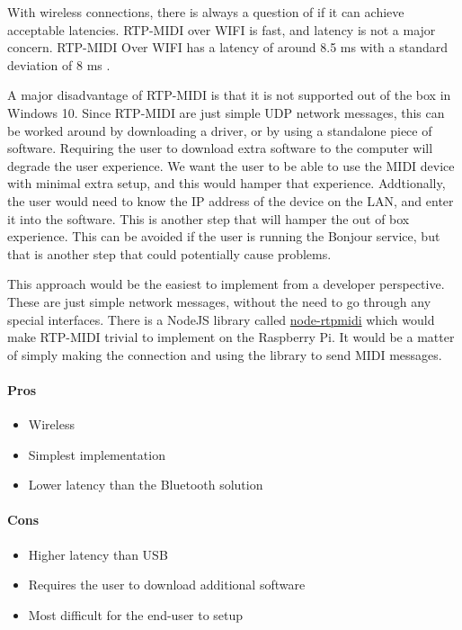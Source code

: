 With wireless connections, there is always a question of if it can achieve acceptable
latencies. RTP-MIDI over WIFI is fast, and latency is not a major concern. RTP-MIDI Over
WIFI has a latency of around 8.5 ms with a standard deviation of 8 ms
\autocite{ble-latency}.

A major disadvantage of RTP-MIDI is that it is not supported out of the box in Windows 10.
Since RTP-MIDI are just simple UDP network messages, this can be worked around by
downloading a driver, or by using a standalone piece of software. Requiring the user to
download extra software to the computer will degrade the user experience. We want the user
to be able to use the MIDI device with minimal extra setup, and this would hamper that
experience. Addtionally, the user would need to know the IP address of the device on the
LAN, and enter it into the software. This is another step that will hamper the out of box
experience. This can be avoided if the user is running the Bonjour service, but that is
another step that could potentially cause problems.

This approach would be the easiest to implement from a developer perspective. These are
just simple network messages, without the need to go through any special interfaces. There
is a NodeJS library called \url{node-rtpmidi} which would make RTP-MIDI trivial to
implement on the Raspberry Pi. It would be a matter of simply making the connection and
using the library to send MIDI messages.

\paragraph{Pros}

\begin{itemize}
  \item Wireless
  \item Simplest implementation
  \item Lower latency than the Bluetooth solution
\end{itemize}

\paragraph{Cons}

\begin{itemize}
  \item Higher latency than USB
  \item Requires the user to download additional software
  \item Most difficult for the end-user to setup
\end{itemize}

